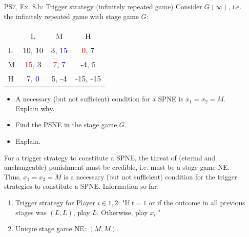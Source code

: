 \begin{frame}{PS7, Ex. 8.b: Trigger strategy (infinitely repeated game)}
    Consider $G(\infty)$, i.e. the infinitely repeated game with stage game $G$: \vspace{-6pt}
    \begin{table}
      \begin{tabular}{l|c|c|c|}
        \multicolumn{1}{c}{} & \multicolumn{1}{c}{L} & \multicolumn{1}{c}{M} & \multicolumn{1}{c}{H} \\\cline{2-4}
        L & 10, 10 & 3, \textcolor{blue}{15} & \textcolor{red}{0}, 7 \\\cline{2-4}
        M & \textcolor{red}{15}, 3 & \textcolor{red}{7}, \textcolor{blue}{7} & -4, 5 \\\cline{2-4}
        H & 7, \textcolor{blue}{0} & 5, -4 & -15, -15 \\\cline{2-4}
      \end{tabular}
    \end{table}
    \begin{itemize}
      \item[(b)] A necessary (but not sufficient) condition for a SPNE is $x_1 = x_2 = M$. Explain why.
    \end{itemize}
  \begin{multicols}{2}
    \begin{itemize}
      \item[(Step a)] Find the PSNE in the stage game $G$.
      \item[(Step b)] Explain.
    \end{itemize}
    For a trigger strategy to constitute a SPNE, the threat of (eternal and unchangeable) punishment must be credible, i.e. must be a stage game NE.\\\medskip
    Thus, $x_1 = x_2 = M$ is a necessary (but not sufficient) condition for the trigger strategies to constitute a SPNE.
    \vfill\null\columnbreak
    Information so far:
    \begin{enumerate}
      \item Trigger strategy for Player $i\in1,2$: "If $t=1$ or if the outcome in all previous stages was $(L,L)$, play $L$. Otherwise, play $x_i$."
      \item Unique stage game NE: $(M,M)$.
    \end{enumerate}
    \vfill\null
  \end{multicols}
\end{frame}

